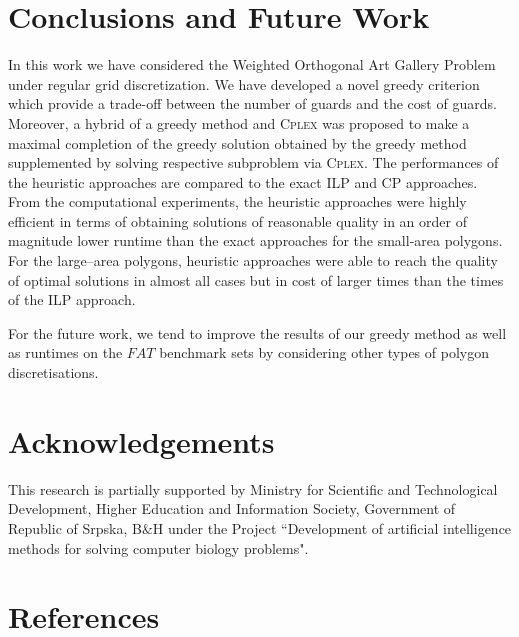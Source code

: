 \documentclass[runningheads,a4paper]{elsarticle}
\begin{document}
	\section{Conclusions and Future Work}
	  In this work we have considered the Weighted Orthogonal Art Gallery Problem under regular grid discretization.
	  We have developed a novel greedy criterion which provide a trade-off between the number of guards and the cost of  guards. Moreover, a hybrid of a greedy method and \textsc{Cplex} was proposed to make a maximal completion of the greedy solution obtained by the greedy method supplemented by solving respective subproblem via \textsc{Cplex}. The performances of the heuristic approaches are compared to the exact ILP and CP approaches. From the computational experiments, the heuristic approaches were highly efficient in terms of obtaining solutions of reasonable quality in an order of magnitude lower runtime than the exact approaches for the small-area polygons. For the large--area polygons, heuristic approaches were able to reach the quality of optimal solutions in almost all cases but in cost of larger times than the times of the ILP approach.
	
	  For the future work, we tend to improve the results of our greedy method as well as runtimes on the $FAT$ benchmark sets by considering other types of polygon discretisations.
	
	
	
	\section*{Acknowledgements}
This research is partially supported by Ministry for Scientific and Technological
Development, Higher Education and Information Society, Government
of Republic of Srpska, B\&H under the Project ``Development of artificial intelligence methods for solving computer biology problems".

	
	\section*{References}
	
	
	
	
\end{document}
